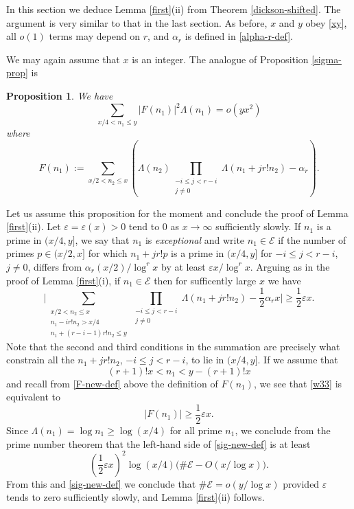 \documentclass[11pt]{amsart}
\numberwithin{equation}{section}  %
\theoremstyle{remark}
\theoremstyle{plain}
\newtheorem{prop}{Proposition}
\numberwithin{equation}{section}
\newcommand{\eps}{\ensuremath{\varepsilon}}
\renewcommand{\le}{\leqslant}
\renewcommand{\leq}{\leqslant}
\renewcommand{\ge}{\geqslant}
\renewcommand{\geq}{\geqslant}
\renewcommand{\(}{\left(}
\renewcommand{\)}{\right)}
\begin{document}
In this section we deduce Lemma \ref{first}(ii) from Theorem \ref{dickson-shifted}. The argument is very similar to that in the last section.  As before, $x$ and $y$ obey \eqref{xy}, all $o(1)$ terms may depend on $r$, and $\alpha_r$ is defined in \eqref{alpha-r-def}.

We may again assume that $x$ is an integer.  The analogue of Proposition \ref{sigma-prop} is


\begin{prop}\label{sigma-prop-2}  We have
\begin{equation}\label{sig-new-def} 
\sum_{x/4 < n_1 \le y} |F(n_1)|^2 \Lambda(n_1) = o(y x^2 )
\end{equation}
where
\begin{equation}\label{F-new-def} F(n_1) := \sum_{x/2<n_2\le x} \left(\Lambda(n_2) \prod_{\substack{-i \leq j < r - i \\ j \neq 0}}\Lambda(n_1 + j r! n_2)  - \alpha_r\right).\end{equation}
\end{prop}


Let us assume this proposition for the moment and conclude the proof of Lemma \ref{first}(ii).
Let $\eps = \eps(x) > 0$ tend to 0 as $x\to\infty$ sufficiently
slowly. 
If $n_1$ is a prime in $(x/4,y]$, we say that $n_1$ is
  \emph{exceptional} and write $n_1 \in \mathscr{E}$ if the number of
  primes $p \in (x/2,x]$ for which $n_1 + j r! p$ is a prime in
    $(x/4,y]$ for $-i \leq j < r - i$, $j \neq 0$, differs from
      $\alpha_r (x/2)/\log^r x$ by at least $\eps x/\log^r x$. 
Arguing as in the proof of Lemma \ref{first}(i), if $n_1
      \in \mathscr{E}$ then for sufficently large $x$ we have
\begin{equation}\label{w33} \Bigg| \sum_{\substack{x/2<n_2\le x \\ n_1 - ir! n_2 > x/4 \\ n_1 + (r - i - 1)r! n_2 \leq y}} \prod_{\substack{-i \leq j < r-i \\ j \neq 0}} \Lambda(n_1 + jr! n_2) - \frac{1}{2}\alpha_r x\bigg| \geq \frac{1}{2}\eps x.\end{equation}
Note that the second and third conditions in the summation are
precisely what constrain all the $n_1 + jr! n_2$, $-i \leq j < r-i$,
to lie in $(x/4,y]$.  If we assume that
\[
(r+1)! x < n_1 < y - (r+1)! x
\]
and recall from \eqref{F-new-def} above the definition of $F(n_1)$,
we see that \eqref{w33} is equivalent to 
\[ |F(n_1)| \geq \frac{1}{2}\eps x.\]
Since $\Lambda(n_1) = \log n_1 \ge \log (x/4)$ for all prime $n_1$, we conclude from
the prime number theorem that the left-hand side of \eqref{sig-new-def} is at least
\[
 \left( \frac12 \eps x \right)^2 \log(x/4) \big( \# \mathscr{E} - O(x/\log x) \big).
\]
From this and \eqref{sig-new-def} we conclude that  $\# \mathscr{E}=o(y/\log
x)$  provided $\eps$ tends to zero sufficiently slowly, and Lemma \ref{first}(ii) follows.
\end{document}
